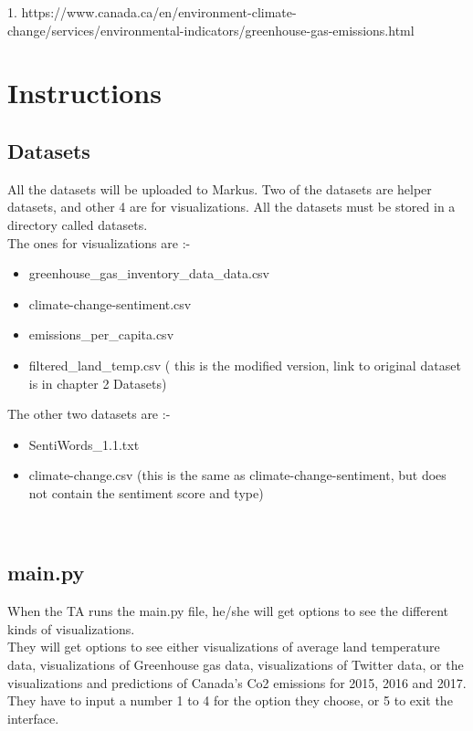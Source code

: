 \documentclass[a4paper, 11pt]{report}
\begin{document}
\scriptsize
1. https://www.canada.ca/en/environment-climate-change/services/environmental-indicators/greenhouse-gas-emissions.html

\chapter{Instructions}

\section{Datasets}
\normalsize
All the datasets will be uploaded to Markus. Two of the datasets are helper datasets, and other 4 are for visualizations. All the datasets must be stored in a directory called datasets.\\

The ones for visualizations are :-

\begin{itemize}
    \item greenhouse\_gas\_inventory\_data\_data.csv
    \item climate-change-sentiment.csv
    \item emissions\_per\_capita.csv
    \item filtered\_land\_temp.csv ( this is the modified version, link to original dataset is in chapter 2 Datasets)\\


\end{itemize}

The other two datasets are :-

\begin{itemize}
    \item SentiWords\_1.1.txt
    \item climate-change.csv (this is the same as climate-change-sentiment, but does not contain the sentiment score and type)
\end{itemize}

~
\newpage

\section{main.py}

When the TA runs the main.py file, he/she will get options to see the different kinds of visualizations. \\

They will get options to see either visualizations of average land temperature data, visualizations of Greenhouse gas data, visualizations of Twitter data, or  the visualizations and predictions of Canada's Co2 emissions for 2015, 2016 and 2017. They have to input a number 1 to 4 for the option they choose, or 5 to exit the interface. \\
\end{document}
